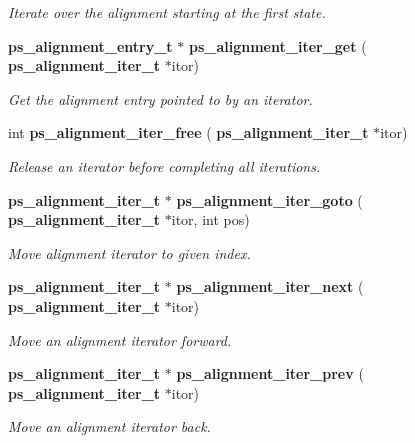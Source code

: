 \begin{DoxyCompactItemize}
\begin{DoxyCompactList}\small\item\em Iterate over the alignment starting at the first state. \end{DoxyCompactList}\item 
\mbox{\label{ps__alignment_8c_aa2962940b54a4e2b73a9a4937d1b245a}} 
\textbf{ ps\+\_\+alignment\+\_\+entry\+\_\+t} $\ast$ \textbf{ ps\+\_\+alignment\+\_\+iter\+\_\+get} (\textbf{ ps\+\_\+alignment\+\_\+iter\+\_\+t} $\ast$itor)
\begin{DoxyCompactList}\small\item\em Get the alignment entry pointed to by an iterator. \end{DoxyCompactList}\item 
\mbox{\label{ps__alignment_8c_a80e0020539ea622706bf63883e24d301}} 
int \textbf{ ps\+\_\+alignment\+\_\+iter\+\_\+free} (\textbf{ ps\+\_\+alignment\+\_\+iter\+\_\+t} $\ast$itor)
\begin{DoxyCompactList}\small\item\em Release an iterator before completing all iterations. \end{DoxyCompactList}\item 
\mbox{\label{ps__alignment_8c_a7cec3eabbedf8d94295d98541bbbaa10}} 
\textbf{ ps\+\_\+alignment\+\_\+iter\+\_\+t} $\ast$ \textbf{ ps\+\_\+alignment\+\_\+iter\+\_\+goto} (\textbf{ ps\+\_\+alignment\+\_\+iter\+\_\+t} $\ast$itor, int pos)
\begin{DoxyCompactList}\small\item\em Move alignment iterator to given index. \end{DoxyCompactList}\item 
\mbox{\label{ps__alignment_8c_aa7fdb0dbac92be80e2182d340be8b8e1}} 
\textbf{ ps\+\_\+alignment\+\_\+iter\+\_\+t} $\ast$ \textbf{ ps\+\_\+alignment\+\_\+iter\+\_\+next} (\textbf{ ps\+\_\+alignment\+\_\+iter\+\_\+t} $\ast$itor)
\begin{DoxyCompactList}\small\item\em Move an alignment iterator forward. \end{DoxyCompactList}\item 
\mbox{\label{ps__alignment_8c_a75e333f3b8a0d14b29d4853a7245b0f9}} 
\textbf{ ps\+\_\+alignment\+\_\+iter\+\_\+t} $\ast$ \textbf{ ps\+\_\+alignment\+\_\+iter\+\_\+prev} (\textbf{ ps\+\_\+alignment\+\_\+iter\+\_\+t} $\ast$itor)
\begin{DoxyCompactList}\small\item\em Move an alignment iterator back. \end{DoxyCompactList}\item 

\end{DoxyCompactItemize}
